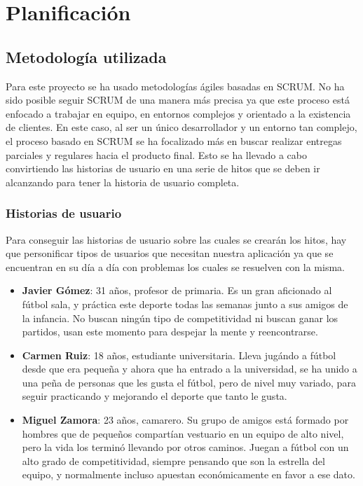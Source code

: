 \chapter{Planificación}

\section{Metodología utilizada}

Para este proyecto se ha usado metodologías ágiles basadas en SCRUM. No ha sido posible seguir SCRUM de una manera más precisa ya que este proceso está enfocado a trabajar en
equipo, en entornos complejos y orientado a la existencia de clientes. En este caso, al ser un único desarrollador y un entorno tan complejo, el proceso basado en SCRUM se ha
focalizado más en buscar realizar entregas parciales y regulares hacia el producto final. Esto se ha llevado a cabo convirtiendo las historias de usuario en una serie de hitos
que se deben ir alcanzando para tener la historia de usuario completa.\\

\subsection{Historias de usuario}

Para conseguir las historias de usuario sobre las cuales se crearán los hitos, hay que personificar tipos de usuarios que necesitan nuestra aplicación ya que se encuentran en su día a día
con problemas los cuales se resuelven con la misma.

\newpage

\begin{itemize}
    \item \textbf{Javier Gómez}: 31 años, profesor de primaria. Es un gran aficionado al fútbol sala, y práctica este deporte todas las semanas junto a sus amigos de la infancia. No buscan ningún tipo de competitividad ni buscan ganar los partidos, usan este momento para despejar la mente y reencontrarse.
    \item \textbf{Carmen Ruiz}: 18 años, estudiante universitaria. Lleva jugándo a fútbol desde que era pequeña y ahora que ha entrado a la universidad, se ha unido a una peña de personas que les gusta el fútbol, pero de nivel muy variado, para seguir practicando y mejorando el deporte que tanto le gusta.
    \item \textbf{Miguel Zamora}: 23 años, camarero. Su grupo de amigos está formado por hombres que de pequeños compartían vestuario en un equipo de alto nivel, pero la vida los terminó llevando por otros caminos. Juegan a fútbol con un alto grado de competitividad, siempre pensando que son la estrella del equipo, y normalmente incluso apuestan económicamente en favor a ese dato.
\end{itemize}

